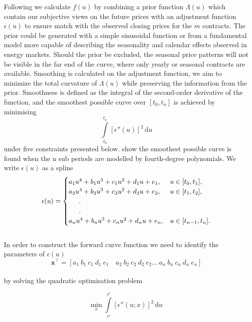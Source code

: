 Following \citet{ollmar2003analysis} we calculate $f(u)$ by combining a prior function $\Lambda(u)$ which contain our subjective views on the future prices with an adjustment function $\epsilon(u)$ to ensure match with the observed closing prices for the $m$ contracts. The prior could be generated with a simple sinusoidal function or from a fundamental model more capable of describing the seasonality and calendar effects observed in energy markets. Should the prior be excluded, the seasonal price patterns will not be visible in the far end of the curve, where only yearly or seasonal contracts are available. Smoothing is calculated on the adjustment function, we aim to minimize the total curvature of $\Lambda(u)$ while preserving the information from the prior. Smoothness is defined as the integral of the second-order derivative of the function, and the smoothest possible curve over $[t_0,t_n]$ is achieved by minimising
\begin{equation*}
\int\limits_{t_0}^{t_n}{[\epsilon''(u)]^2}\,\mathrm{d}u
\end{equation*}
under five constraints presented below. \citet{lim2002computing} show the smoothest possible curve is found when the n sub periods are modelled by fourth-degree polynomials. We write $\epsilon(u)$ as a spline
\begin{equation*}
  \epsilon(u)=\begin{cases}
    a_1u^4+b_1u^3+c_1u^2+d_1u+e_1, & {u \in [t_0,t_1] },\\
    a_2u^4+b_2u^3+c_2u^2+d_2u+e_2, & {u \in [t_1,t_2] },\\
      \indent.\\
    	\indent.\\
    a_nu^4+b_nu^3+c_nu^2+d_nu+e_n, & {u \in [t_{n-1},t_n] }.\\
  \end{cases}
\end{equation*}
\\
In order to construct the forward curve function we need to identify the parameters of $\epsilon(u)$
\begin{equation*}
\mathbf{x}^\intercal = [a_1\ b_1\ c_1\ d_1\ e_1\quad a_2\ b_2\ c_2\ d_2\ e_2\dots\
a_n\ b_n\ c_n\ d_n\ e_n]
\end{equation*}
\\
by solving the quadratic optimisation problem

\begin{equation}
\min_{x}{\int\limits_{\tau^s}^{\tau^e}{[\epsilon''(u;x)]^2}\,\mathrm{d}u}\ \label{quadmin}
\end{equation}

